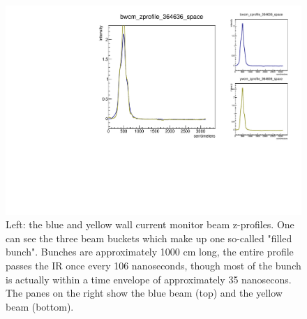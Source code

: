 \begin{figure}
\begin{center}
\includegraphics[width=\linewidth,height=\textheight,keepaspectratio]{./figures/364636_wcm_zprofile}
\caption{ 
Left: the blue and yellow wall current monitor beam z-profiles. One can see the
three beam buckets which make up one so-called "filled bunch". Bunches are
approximately 1000 cm long, the entire profile passes the IR once every 106
nanoseconds, though most of the bunch is actually within a time envelope of
approximately 35 nanosecons. The panes on the right show the blue beam (top)
and the yellow beam (bottom).
}
\label{fig:364636_wcm_zprofile}
\end{center}
\end{figure}
